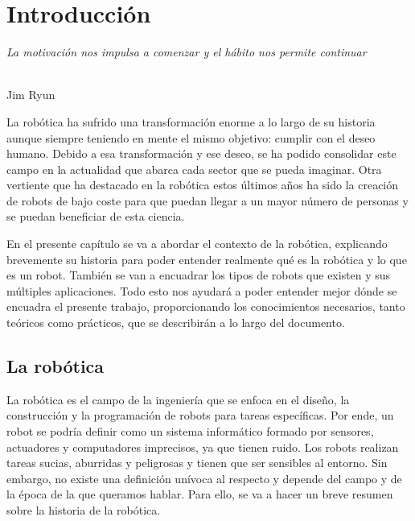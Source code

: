 \chapter{Introducción}
\label{cap:capitulo1}
\setcounter{page}{1}

\begin{flushright}
\begin{minipage}[]{10cm}
\emph{La motivación nos impulsa a comenzar y el hábito nos permite continuar}\\
\end{minipage}\\

Jim Ryun\\
\end{flushright}

\vspace{1cm}

La robótica ha sufrido una transformación enorme a lo largo de su historia aunque siempre teniendo en mente el mismo objetivo: cumplir con el deseo humano. Debido a esa transformación y ese deseo, se ha podido consolidar este campo en la actualidad que abarca cada sector que se pueda imaginar. Otra vertiente que ha destacado en la robótica estos últimos años ha sido la creación de robots de bajo coste para que puedan llegar a un mayor número de personas y se puedan beneficiar de esta ciencia. 

En el presente capítulo se va a abordar el contexto de la robótica, explicando brevemente su historia para poder entender realmente qué es la robótica y lo que es un robot. También se van a encuadrar los tipos de robots que existen y sus múltiples aplicaciones. Todo esto nos ayudará a poder entender mejor dónde se encuadra el presente trabajo, proporcionando los conocimientos necesarios, tanto teóricos como prácticos, que se describirán a lo largo del documento.\\

\section{La robótica}
\label{sec:robotica} %

La robótica es el campo de la ingeniería que se enfoca en el diseño, la construcción y la programación de robots para tareas específicas. Por ende, un robot se podría definir como un sistema informático formado por sensores, actuadores y computadores imprecisos, ya que tienen ruido. Los robots realizan tareas sucias, aburridas y peligrosas y tienen que ser sensibles al entorno. Sin embargo, no existe una definición unívoca al respecto y depende del campo y de la época de la que queramos hablar. Para ello, se va a hacer un breve resumen sobre la historia de la robótica.

